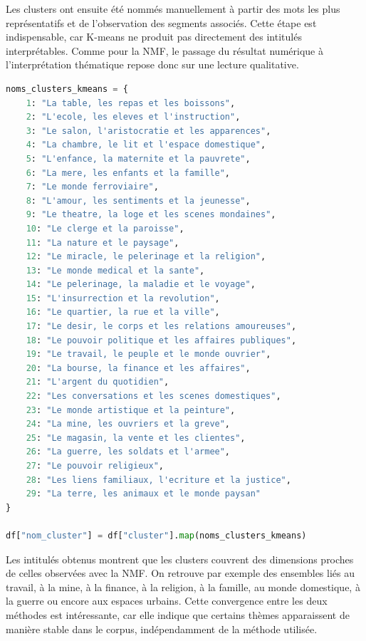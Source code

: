 \documentclass{article}
\begin{document}
Les clusters ont ensuite été nommés manuellement à partir des mots les plus représentatifs et de l'observation des segments associés. Cette étape est indispensable, car K-means ne produit pas directement des intitulés interprétables. Comme pour la NMF, le passage du résultat numérique à l'interprétation thématique repose donc sur une lecture qualitative.

\begin{lstlisting}[language=Python, caption={Attribution manuelle des noms de clusters}]
noms_clusters_kmeans = {
    1: "La table, les repas et les boissons",
    2: "L'ecole, les eleves et l'instruction",
    3: "Le salon, l'aristocratie et les apparences",
    4: "La chambre, le lit et l'espace domestique",
    5: "L'enfance, la maternite et la pauvrete",
    6: "La mere, les enfants et la famille",
    7: "Le monde ferroviaire",
    8: "L'amour, les sentiments et la jeunesse",
    9: "Le theatre, la loge et les scenes mondaines",
    10: "Le clerge et la paroisse",
    11: "La nature et le paysage",
    12: "Le miracle, le pelerinage et la religion",
    13: "Le monde medical et la sante",
    14: "Le pelerinage, la maladie et le voyage",
    15: "L'insurrection et la revolution",
    16: "Le quartier, la rue et la ville",
    17: "Le desir, le corps et les relations amoureuses",
    18: "Le pouvoir politique et les affaires publiques",
    19: "Le travail, le peuple et le monde ouvrier",
    20: "La bourse, la finance et les affaires",
    21: "L'argent du quotidien",
    22: "Les conversations et les scenes domestiques",
    23: "Le monde artistique et la peinture",
    24: "La mine, les ouvriers et la greve",
    25: "Le magasin, la vente et les clientes",
    26: "La guerre, les soldats et l'armee",
    27: "Le pouvoir religieux",
    28: "Les liens familiaux, l'ecriture et la justice",
    29: "La terre, les animaux et le monde paysan"
}

df["nom_cluster"] = df["cluster"].map(noms_clusters_kmeans)
\end{lstlisting}

Les intitulés obtenus montrent que les clusters couvrent des dimensions proches de celles observées avec la NMF. On retrouve par exemple des ensembles liés au travail, à la mine, à la finance, à la religion, à la famille, au monde domestique, à la guerre ou encore aux espaces urbains. Cette convergence entre les deux méthodes est intéressante, car elle indique que certains thèmes apparaissent de manière stable dans le corpus, indépendamment de la méthode utilisée.
\end{document}
